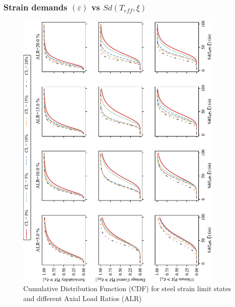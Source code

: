 \subsubsection{Strain demands $(\varepsilon)$ vs $Sd(T_{eff},\xi)$}
\begin{figure}[htbp]
	\centering
	\includegraphics[width=0.9\textwidth]{VAC Thesis 2.0/Chapter-5/figs/CDF_summary.pdf}
	\caption{Cumulative Distribution Function (CDF) for steel strain limit states and different Axial Load Ratios (ALR)}
	\label{fig:CDF_strain_vs_ALR}
\end{figure}

